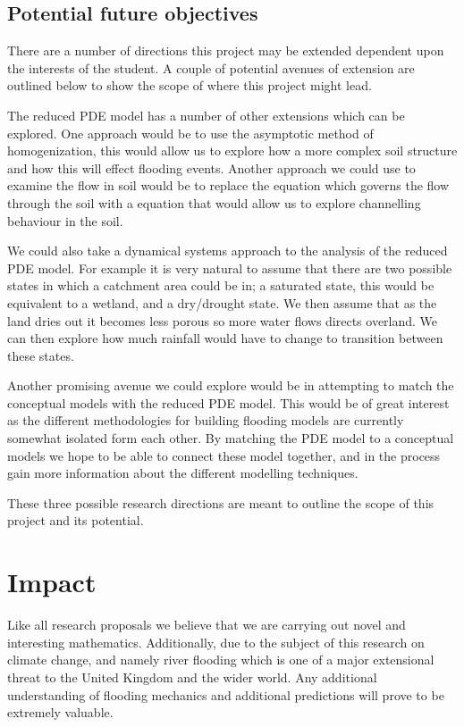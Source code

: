 \documentclass[11pt]{article}
\begin{document}
\subsection{Potential future objectives}

There are a number of directions this project may be extended dependent upon the interests of the student. A couple of potential avenues of extension are outlined below to show the scope of where this project might lead.

 The reduced PDE model has a number of other extensions which can be explored. One approach would be to use the asymptotic method of homogenization, this would allow us to explore how a more complex soil structure and how this will effect flooding events. Another approach we could use to examine the flow in soil would be to replace the equation which governs the flow through the soil with a equation that would allow us to explore channelling behaviour in the soil.

We could also take a dynamical systems approach to the analysis of the reduced PDE model. For example it is very natural to assume that there are two possible states in which a catchment area could be in; a saturated state, this would be equivalent to a wetland, and a dry/drought state. We then assume that as the land dries out it becomes less porous so more water flows directs overland. We can then explore how much rainfall would have to change to transition between these states.

Another promising avenue we could explore would be in attempting to match the conceptual models with the reduced PDE model. This would be of great interest as the different methodologies for building flooding models are currently somewhat isolated form each other. By matching the PDE model to a conceptual models we hope to be able to connect these model together, and in the process gain more information about the different modelling techniques.

These three possible research directions are meant to outline the scope of this project and its potential.



\section{Impact}
Like all research proposals we believe that we are carrying out novel and interesting mathematics. Additionally, due to the subject of this research on climate change, and namely river flooding which is one of a major extensional threat to the United Kingdom and the wider world. Any additional understanding of flooding mechanics and additional predictions will prove to be extremely valuable.
\end{document}
